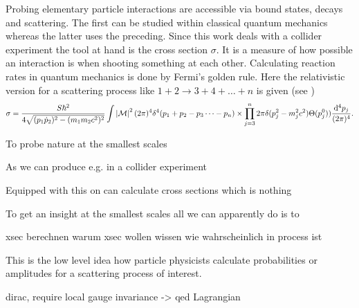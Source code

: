Probing elementary particle interactions are accessible via bound states, decays and scattering. The first can be studied within classical quantum mechanics whereas the latter uses the preceding. Since this work deals with a collider experiment the tool at hand is the cross section $\sigma$. It is a measure of how possible an interaction is when shooting something at each other. Calculating reaction rates in quantum mechanics is done by Fermi's golden rule. Here the relativistic version for a scattering process like $1+2 \rightarrow 3+4+\dots+n$ is given (see \citep{griffiths2020introduction})
\begin{equation}
    \sigma=\frac{S\hbar^2}{4\sqrt{(p_1\dot p_2)^2 - (m_1m_2c^2)^2}}\int \left\vert\mathcal{M}\right\vert^2(2\pi)^4\delta^4(p_1+p_2-p_3 \dots-p_n) 
    \times \prod_{j=3}^n 2\pi \delta(p_j^2-m_j^2c^2)\Theta(p_j^0))\frac{\mathrm
    d^4p_j}{(2\pi)^4}.
\end{equation}




To probe nature at the smallest scales 

As we can produce e.g. in a collider experiment 

Equipped with this on can calculate cross sections which is nothing 


To get an insight at the smallest scales all we can apparently do is to 

xsec berechnen
warum xsec 
wollen wissen wie wahrscheinlich in process ist 


This is the low level idea how particle physicists calculate probabilities or amplitudes for a scattering process of interest. 


dirac, require local gauge invariance -> qed Lagrangian
